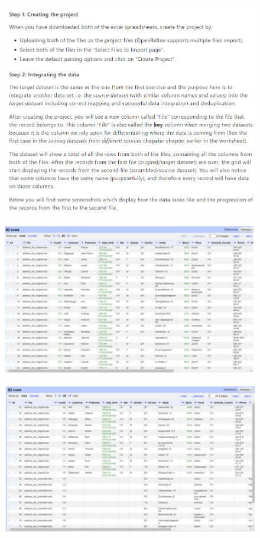 \begin{figure}[H]
    \includegraphics[width=\linewidth]{./Figures/Appendices/worksheet/26.png}
\end{figure}
\begin{figure}[H]
    \includegraphics[width=\linewidth]{./Figures/Appendices/worksheet/27.png}
\end{figure}
\begin{figure}[H]
    \includegraphics[width=\linewidth]{./Figures/Appendices/worksheet/28.png}
\end{figure}

